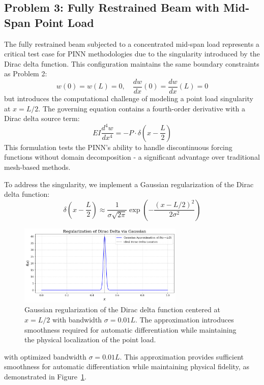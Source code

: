 \documentclass[12pt]{article}
\begin{document}
\subsection{Problem 3: Fully Restrained Beam with Mid-Span Point Load}

The fully restrained beam subjected to a concentrated mid-span load represents a critical test case for PINN methodologies due to the singularity introduced by the Dirac delta function. This configuration maintains the same boundary constraints as Problem 2:
\[
w(0) = w(L) = 0, \quad \frac{dw}{dx}(0) = \frac{dw}{dx}(L) = 0
\]
but introduces the computational challenge of modeling a point load singularity at $x = L/2$. The governing equation contains a fourth-order derivative with a Dirac delta source term:
\[
EI \frac{d^4 w}{dx^4} = -P \cdot \delta\left(x - \frac{L}{2}\right)
\]
This formulation tests the PINN's ability to handle discontinuous forcing functions without domain decomposition - a significant advantage over traditional mesh-based methods.

To address the singularity, we implement a Gaussian regularization of the Dirac delta function:
\[
\delta\left(x - \frac{L}{2}\right) \approx \frac{1}{\sigma\sqrt{2\pi}} \exp\left(-\frac{(x - L/2)^2}{2\sigma^2}\right)
\]

\begin{figure}[htbp]
  \centering
  \includegraphics[width=0.7\textwidth]{figure_delta_regularization.png}
  \caption{Gaussian regularization of the Dirac delta function centered at $x = L/2$ with bandwidth $\sigma = 0.01L$. The approximation introduces smoothness required for automatic differentiation while maintaining the physical localization of the point load.}
  \label{fig:delta_approximation}
\end{figure}


with optimized bandwidth $\sigma = 0.01L$. This approximation provides sufficient smoothness for automatic differentiation while maintaining physical fidelity, as demonstrated in Figure~\ref{fig:delta_approximation}.
\end{document}
